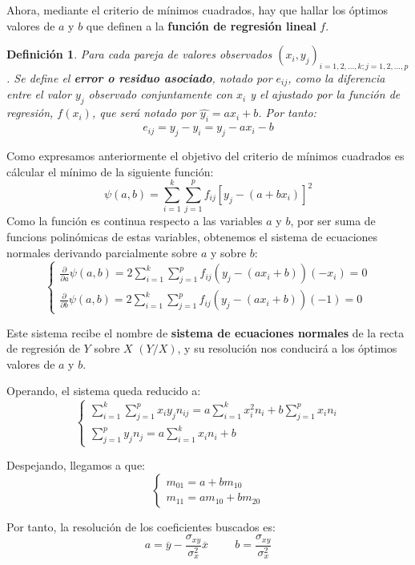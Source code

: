 \documentclass[10pt, a4paper]{article}
\theoremstyle{theorem-style}
\theoremstyle{definition-style}
\newtheorem{ndef}{Definición}[section]
\theoremstyle{remark-style}
\theoremstyle{example-style}
\theoremstyle{definition-style}
\theoremstyle{remark-style}
\begin{document}
	Ahora, mediante el criterio de mínimos cuadrados, hay que hallar los óptimos
	valores de $a$ y $b$ que definen a la \textbf{función de regresión lineal} $f$.
	\vspace{2mm}
	
\begin{ndef}
	Para cada pareja de valores observados ${(x_i,y_j)}_{i=1,2, \ldots, k; j=1,2,\ldots,p}$. Se
	define el \textbf{error o residuo asociado}, notado por $e_{ij}$, como la diferencia
	entre el valor $y_j$ observado conjuntamente con $x_i$ y el ajustado por la
	función de regresión, $f(x_i)$, que será notado por $\hat{y_i} = ax_i +b$. Por
	tanto:
	$$e_{ij} = y_j - \hat{y_i} = y_j - ax_i - b $$
\end{ndef}

	Como expresamos anteriormente el objetivo del criterio de mínimos cuadrados es
	cálcular el mínimo de la siguiente función:
	$$
	\psi (a,b) =
			\sum_{i=1}^k \sum_{j=1}^p f_{ij} {[y_j - (a+bx_i)]}^2
	$$
	Como la función es continua respecto a las variables $a$ y $b$, por ser suma
	de funcions polinómicas de estas variables, obtenemos el sistema
	de ecuaciones normales derivando parcialmente sobre $a$ y sobre $b$:
	$$\begin{cases} \frac{\partial}{\partial a} \psi(a,b) = 2 \sum_{i=1}^k \sum_{j=1}^p f_{ij} ( y_j -
	(ax_i +b )) (-x_i) = 0 \\ \frac{\partial}{\partial b} \psi(a,b) = 2
	\sum_{i=1}^k \sum_{j=1}^p f_{ij}  ( y_j - (ax_i +b )) (-1) = 0 \end{cases}$$

	Este sistema recibe el nombre de \textbf{sistema de ecuaciones normales} de la recta
	de regresión de $Y$ sobre $X$ $(Y/X)$, y su resolución nos conducirá a los óptimos
	valores de $a$ y $b$. 
	
	Operando, el sistema queda reducido a:
	$$\begin{cases} \sum_{i=1}^k \sum_{j=1}^p x_i y_j n_{ij}  = a \sum_{i=1}^k x_i^2 n_i +
	b\sum_{j= 1}^p x_i n_i  \\ \sum_{j=1}^p y_j n_j = a \sum_{i=1}^k x_i n_i + b\end{cases}$$
	
	Despejando, llegamos a que:
	$$\begin{cases} m_{01} = a + bm_{10} \\ m_{11} = am_{10} + bm_{20} \end{cases}$$
	
	Por tanto, la resolución de los coeficientes buscados es:
	$$ a = \overline{y} - \frac{\sigma_{xy}}{\sigma_x^2} \overline{x} \hspace{1cm}  b =
	\frac{\sigma_{xy}}{\sigma_x^2}  $$ 
\end{document}
